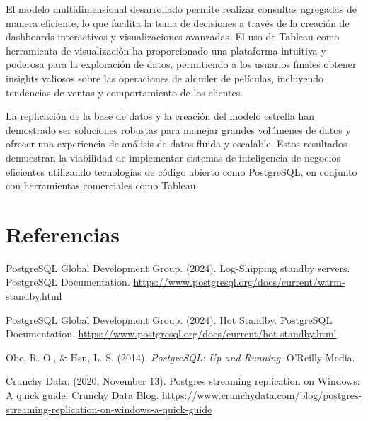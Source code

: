 \documentclass{article}
\begin{document}
El modelo multidimensional desarrollado permite realizar consultas agregadas de manera eficiente, lo que facilita la toma de decisiones a través de la creación de dashboards interactivos y visualizaciones avanzadas. El uso de Tableau como herramienta de visualización ha proporcionado una plataforma intuitiva y poderosa para la exploración de datos, permitiendo a los usuarios finales obtener insights valiosos sobre las operaciones de alquiler de películas, incluyendo tendencias de ventas y comportamiento de los clientes.

La replicación de la base de datos y la creación del modelo estrella han demostrado ser soluciones robustas para manejar grandes volúmenes de datos y ofrecer una experiencia de análisis de datos fluida y escalable. Estos resultados demuestran la viabilidad de implementar sistemas de inteligencia de negocios eficientes utilizando tecnologías de código abierto como PostgreSQL, en conjunto con herramientas comerciales como Tableau.

\newpage
\section*{Referencias}

PostgreSQL Global Development Group. (2024). Log-Shipping standby servers. PostgreSQL Documentation. \url{https://www.postgresql.org/docs/current/warm-standby.html}

PostgreSQL Global Development Group. (2024). Hot Standby. PostgreSQL Documentation. \url{https://www.postgresql.org/docs/current/hot-standby.html}

Obe, R. O., \& Hsu, L. S. (2014). \textit{PostgreSQL: Up and Running}. O'Reilly Media.

Crunchy Data. (2020, November 13). Postgres streaming replication on Windows: A quick guide. Crunchy Data Blog. \url{https://www.crunchydata.com/blog/postgres-streaming-replication-on-windows-a-quick-guide}
\end{document}
